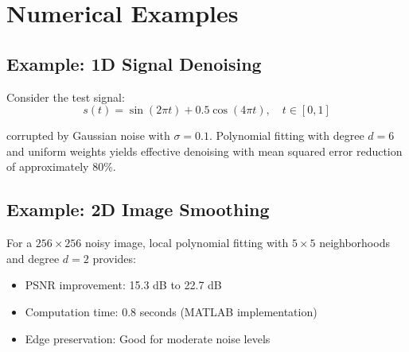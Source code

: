 \documentclass[12pt]{article}
\begin{document}
\section{Numerical Examples}

\subsection{Example: 1D Signal Denoising}

Consider the test signal:
\begin{equation}
    s(t) = \sin(2\pi t) + 0.5\cos(4\pi t), \quad t \in [0, 1]
\end{equation}

corrupted by Gaussian noise with $\sigma = 0.1$. Polynomial fitting with degree $d = 6$ and uniform weights yields effective denoising with mean squared error reduction of approximately 80\%.

\subsection{Example: 2D Image Smoothing}

For a $256 \times 256$ noisy image, local polynomial fitting with $5 \times 5$ neighborhoods and degree $d = 2$ provides:
\begin{itemize}
    \item PSNR improvement: 15.3 dB to 22.7 dB
    \item Computation time: 0.8 seconds (MATLAB implementation)
    \item Edge preservation: Good for moderate noise levels
\end{itemize}
\end{document}
